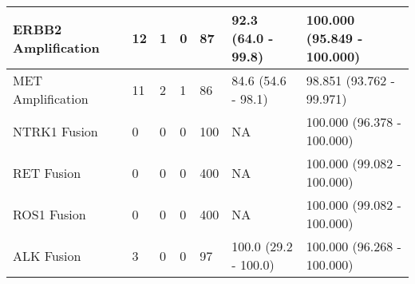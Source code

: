 \begin{tabular}{|l|l|l|l|l|l|l|}
ERBB2 Amplification         &   12 &    1 &    0 &     87 &    92.3 (64.0 - 99.8) &  100.000 (95.849 - 100.000) \\ \hline
MET Amplification           &   11 &    2 &    1 &     86 &    84.6 (54.6 - 98.1) &    98.851 (93.762 - 99.971) \\ \hline
NTRK1 Fusion                &    0 &    0 &    0 &    100 &                    NA &  100.000 (96.378 - 100.000) \\ \hline
RET Fusion                  &    0 &    0 &    0 &    400 &                    NA &  100.000 (99.082 - 100.000) \\ \hline
ROS1 Fusion                 &    0 &    0 &    0 &    400 &                    NA &  100.000 (99.082 - 100.000) \\ \hline
ALK Fusion                  &    3 &    0 &    0 &     97 &  100.0 (29.2 - 100.0) &  100.000 (96.268 - 100.000) \\ \hline
\end{tabular}